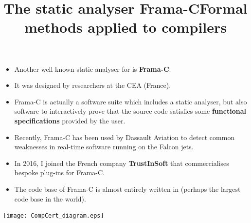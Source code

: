 \documentclass[wide]{slides}
\begin{document}
\begin{slide}
  \title{The static analyser Frama-C}

  \begin{itemize}

    \item Another well\hyp{}known static analyser for \Clang is
      \textbf{Frama-C}.

    \item It was designed by researchers at the CEA (France).

    \item Frama-C is actually a software suite which includes a static
      analyser, but also software to interactively prove that the
      source code satisfies some \textbf{functional specifications}
      provided by the user.

    \item Recently, Frama-C has been used by Dassault Aviation to
      detect common weaknesses in real\hyp{}time software running on
      the Falcon jets.

    \item In 2016, I joined the French company \textbf{TrustInSoft}
      that commercialises bespoke plug\hyp{}ins for Frama-C.

    \item The code base of Frama-C is almost entirely written in
      \OCaml (perhaps the largest \OCaml code base in the world).

  \end{itemize}

\end{slide}

\begin{slide}
  \title{Formal methods applied to compilers}

  \texttt{[image: CompCert\_diagram.eps]}

\end{slide}
\end{document}
